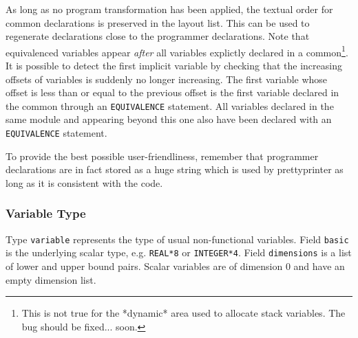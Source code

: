 \documentclass[a4paper]{article}
\begin{document}
\begin{comment}
Le sous-domaine \texttt{layout} donne la
liste des entit�s stock�es dans cette aire. Il s'agit des variables
d�clar�es dans ce common dans n'importe quel module.
\end{comment}

As long as no program transformation has been applied, the textual order
for common declarations is preserved in the layout list. This can be used
to regenerate declarations close to the programmer declarations. Note that
equivalenced variables appear \emph{after} all variables explictly declared
in a common\footnote{This is not true for the *dynamic* area used to
  allocate stack variables. The bug should be fixed... soon.}. It is
possible to detect the first implicit variable by checking that the
increasing offsets of variables is suddenly no longer increasing. The
first variable whose offset is less than or equal to the previous offset
is the first variable declared in the common through an \texttt{EQUIVALENCE}
statement. All variables declared in the same module and appearing beyond
this one also have been declared with an \texttt{EQUIVALENCE} statement.

To provide the best possible user-friendliness, remember that programmer
declarations are in fact stored as a huge string which is used by
prettyprinter as long as it is consistent with the code.

\begin{comment}
L'ordre des d�clarations des variables est respect�, ce qui
permettrait de reproduire des programmes sources fid�les � ce
qu'�taient les programmes initiaux\footnote{Les d�clarations sont en
fait conserv�es sous forme textuelle pour garantir une fid�lit�
absolue.}.
\end{comment}

\subsubsection{Variable Type}
\label{subsubsection-variable}


Type \texttt{variable} represents the type of usual non-functional
variables. Field \texttt{basic} is the underlying scalar type, e.g. 
\texttt{REAL*8} or \texttt{INTEGER*4}. 
Field \texttt{dimensions} is a list of lower and upper bound pairs. 
Scalar variables are of dimension 0 and have an empty dimension list.
\end{document}

